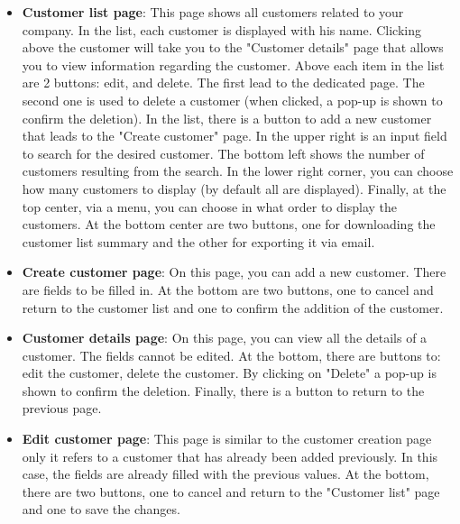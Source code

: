 \begin{itemize}
    \item \textbf{Customer list page}: This page shows all customers related to your company.
In the list, each customer is displayed with his name. Clicking above the customer will take you to the "Customer details" page that allows you to view information regarding the customer. Above each item in the list are 2 buttons: edit, and delete. The first lead to the dedicated page. The second one is used to delete a customer (when clicked, a pop-up is shown to confirm the deletion). In the list, there is a button to add a new customer that leads to the "Create customer" page.
In the upper right is an input field to search for the desired customer.
The bottom left shows the number of customers resulting from the search. In the lower right corner, you can choose how many customers to display (by default all are displayed). Finally, at the top center, via a menu, you can choose in what order to display the customers.
At the bottom center are two buttons, one for downloading the customer list summary and the other for exporting it via email.
    \item \textbf{Create customer page}: On this page, you can add a new customer. There are fields to be filled in. At the bottom are two buttons, one to cancel and return to the customer list and one to confirm the addition of the customer.
    \item \textbf{Customer details page}: On this page, you can view all the details of a customer. The fields cannot be edited. At the bottom, there are buttons to: edit the customer, delete the customer. By clicking on "Delete" a pop-up is shown to confirm the deletion. Finally, there is a button to return to the previous page.
    \item \textbf{Edit customer page}: This page is similar to the customer creation page only it refers to a customer that has already been added previously. In this case, the fields are already filled with the previous values. At the bottom, there are two buttons, one to cancel and return to the "Customer list" page and one to save the changes.
\end{itemize}
\newpage
